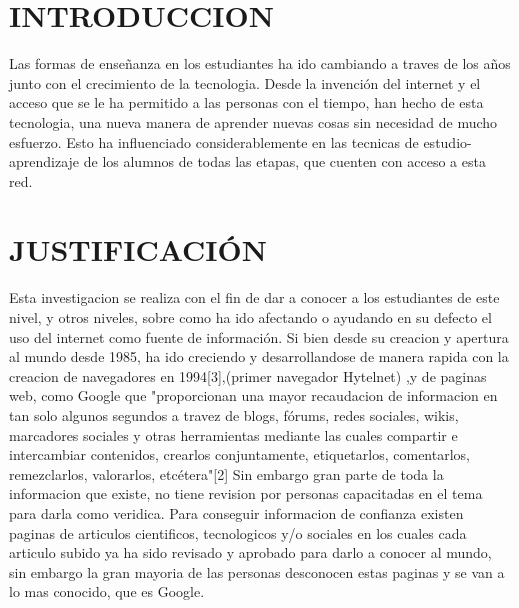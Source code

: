 \documentclass{bmcart}
\begin{document}




\section*{INTRODUCCION}
Las formas de enseñanza en los estudiantes ha ido cambiando a traves de los años junto con el crecimiento de la tecnologia. Desde la invención del internet y el acceso que se le ha permitido a las personas con el tiempo, han hecho de esta tecnologia, una nueva manera de aprender nuevas cosas sin necesidad de mucho esfuerzo. Esto ha influenciado considerablemente en las tecnicas de estudio-aprendizaje de los alumnos de todas las etapas, que cuenten con acceso a esta red.

\section*{JUSTIFICACIÓN}
Esta investigacion se realiza con el fin de dar a conocer a los estudiantes de este nivel, y otros niveles, sobre como ha ido afectando o ayudando en su defecto el uso del internet como fuente de información. Si bien desde su creacion y apertura al mundo desde 1985, ha ido creciendo y desarrollandose de manera rapida con la creacion de navegadores en 1994[3],(primer navegador Hytelnet) ,y de paginas web, como Google que "proporcionan una mayor recaudacion de informacion en tan solo algunos segundos a travez de blogs, fórums, redes sociales, wikis, marcadores sociales y otras herramientas mediante las cuales compartir e intercambiar contenidos, crearlos conjuntamente, etiquetarlos, comentarlos, remezclarlos, valorarlos, etcétera"[2] Sin embargo gran parte de toda la informacion que existe, no tiene revision por personas capacitadas en el tema para darla como veridica.
Para conseguir informacion de confianza existen paginas de articulos cientificos, tecnologicos y/o sociales en los cuales cada articulo subido ya ha sido revisado y aprobado para darlo a conocer al mundo, sin embargo la gran mayoria de las personas desconocen estas paginas y se van a lo mas conocido, que es Google.
\end{document}
